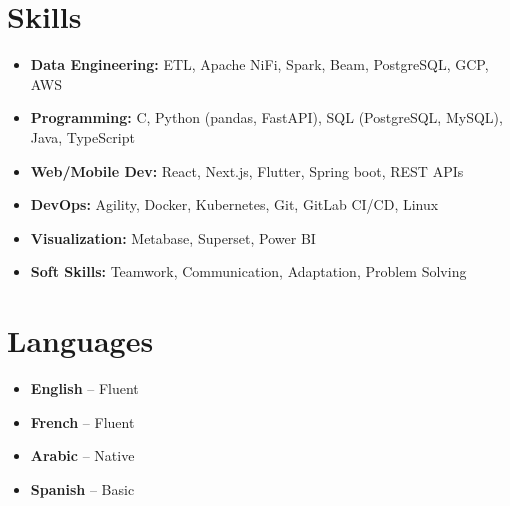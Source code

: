 \documentclass[10pt,a4paper,sans]{moderncv}
\begin{document}
    \vspace{-14pt}
    \section{Skills}
    \vspace{-2pt}
    \begin{itemize}[leftmargin=0.5cm, itemsep=0pt, topsep=0pt]
    \item \textbf{Data Engineering:} ETL, Apache NiFi, Spark, Beam, PostgreSQL, GCP, AWS
    \item \textbf{Programming:} C, Python (pandas, FastAPI), SQL (PostgreSQL, MySQL), Java, TypeScript 
    \item \textbf{Web/Mobile Dev:} React, Next.js, Flutter, Spring boot, REST APIs
    \item \textbf{DevOps:} Agility, Docker, Kubernetes, Git, GitLab CI/CD, Linux
    \item \textbf{Visualization:} Metabase, Superset, Power BI
    \item \textbf{Soft Skills:} Teamwork, Communication, Adaptation, Problem Solving
    \end{itemize}

 
\vspace{-15pt}
\section{Languages}
\vspace{-15pt}
\begin{multicols}{2}
\begin{itemize}[leftmargin=0.3cm, itemsep=0pt, topsep=0pt, partopsep=0pt, parsep=0pt]
    \item \textbf{English} – Fluent
    \item \textbf{French} – Fluent
    \item \textbf{Arabic} – Native
    \item \textbf{Spanish} – Basic
\end{itemize}
\end{multicols}
\vspace{-8pt}
\end{document}
